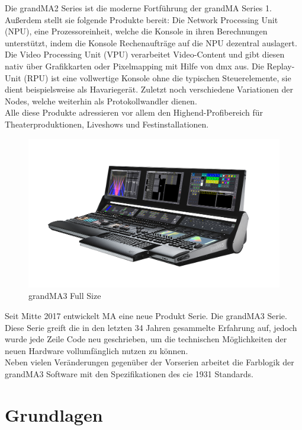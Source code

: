\documentclass[11pt]{scrartcl}
\begin{document}
\noindent
Die grandMA2 Series ist die moderne Fortführung der grandMA Series 1. Außerdem stellt sie
folgende Produkte bereit: Die Network Processing Unit (NPU), eine Prozessoreinheit, welche die
Konsole in ihren Berechnungen unterstützt, indem die Konsole Rechenaufträge auf die NPU dezentral
auslagert. Die Video Processing Unit (VPU) verarbeitet Video-Content und gibt diesen nativ über
Grafikkarten oder Pixelmapping mit Hilfe von \ac{dmx} aus. Die Replay-Unit (RPU) ist eine vollwertige
Konsole ohne die typischen Steuerelemente, sie dient beispielsweise als Havariegerät. Zuletzt noch
verschiedene Variationen der Nodes, welche weiterhin als Protokollwandler dienen.\\
Alle diese Produkte adressieren vor allem den Highend-Profibereich für Theaterproduktionen,
Liveshows und Festinstallationen.\\
\begin{figure}[H]
    \includegraphics[width=\textwidth]{images/grandMA3-full-size.png}
    \caption{grandMA3 Full Size}\label{fig:gma3}
\end{figure}
\noindent
Seit Mitte 2017 entwickelt MA eine neue Produkt Serie. Die grandMA3 Serie. Diese Serie greift die
in den letzten 34 Jahren gesammelte Erfahrung auf, jedoch wurde jede Zeile Code neu geschrieben,
um die technischen Möglichkeiten der neuen Hardware vollumfänglich nutzen zu können.\\
Neben vielen Veränderungen gegenüber der Vorserien arbeitet die Farblogik der grandMA3 Software
mit den Spezifikationen des \ac{cie} 1931 Standards.
\clearpage

\section{Grundlagen}
\end{document}
